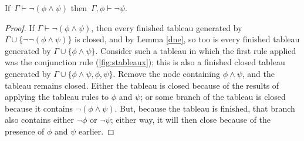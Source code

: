\begin{lemma} \label{negcon}
	If\, $\Gamma \vdash \neg(\phi \wedge\psi)$ then\, $\Gamma, \phi \vdash \neg\psi$.
\end{lemma}
\begin{proof}
	If $\Gamma \vdash \neg(\phi \wedge\psi)$, then every finished tableau generated by $\Gamma \cup \{¬¬(\phi\wedge\psi)\}$ is closed, and by Lemma \ref{dne}, so too is every finished tableau generated by $\Gamma \cup \{\phi\wedge\psi\}$. Consider such a tableau in which the first rule applied was the conjunction rule (\autoref{fig:stableaux}); this is also a finished closed tableau generated by $\Gamma \cup \{\phi\wedge\psi,\phi,\psi\}$. Remove the node containing $\phi\wedge\psi$, and the tableau remains closed. Either the tableau is closed because of the results of applying the tableau rules to $\phi$ and $\psi$; or some branch of the tableau is closed because it contains $\neg(\phi\wedge\psi)$. But, because the tableau is finished, that branch also contains either $\neg \phi$ or $\neg\psi$; either way, it will then close because of the presence of $\phi$ and $\psi$ earlier.
\end{proof}

